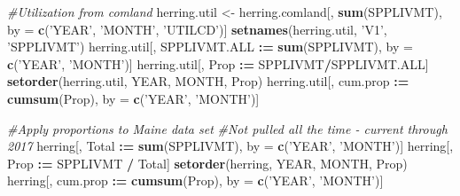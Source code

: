 \documentclass[]{article}
\newenvironment{Shaded}{\begin{snugshade}}{\end{snugshade}}
\newcommand{\KeywordTok}[1]{\textcolor[rgb]{0.13,0.29,0.53}{\textbf{#1}}}
\newcommand{\StringTok}[1]{\textcolor[rgb]{0.31,0.60,0.02}{#1}}
\newcommand{\CommentTok}[1]{\textcolor[rgb]{0.56,0.35,0.01}{\textit{#1}}}
\newcommand{\OperatorTok}[1]{\textcolor[rgb]{0.81,0.36,0.00}{\textbf{#1}}}
\newcommand{\ErrorTok}[1]{\textcolor[rgb]{0.64,0.00,0.00}{\textbf{#1}}}
\newcommand{\NormalTok}[1]{#1}
\begin{document}
\begin{Shaded}
\begin{Highlighting}[]
{{{{{{\CommentTok{#Utilization from comland}
\NormalTok{herring.util <-}\StringTok{ }\NormalTok{herring.comland[, }\KeywordTok{sum}\NormalTok{(SPPLIVMT), by =}\StringTok{ }\KeywordTok{c}\NormalTok{(}\StringTok{'YEAR'}\NormalTok{, }\StringTok{'MONTH'}\NormalTok{, }\StringTok{'UTILCD'}\NormalTok{)]}
\KeywordTok{setnames}\NormalTok{(herring.util, }\StringTok{'V1'}\NormalTok{, }\StringTok{'SPPLIVMT'}\NormalTok{)}
\NormalTok{herring.util[, SPPLIVMT.ALL }\OperatorTok{:}\ErrorTok{=}\StringTok{ }\KeywordTok{sum}\NormalTok{(SPPLIVMT), by =}\StringTok{ }\KeywordTok{c}\NormalTok{(}\StringTok{'YEAR'}\NormalTok{, }\StringTok{'MONTH'}\NormalTok{)]}
\NormalTok{herring.util[, Prop }\OperatorTok{:}\ErrorTok{=}\StringTok{ }\NormalTok{SPPLIVMT}\OperatorTok{/}\NormalTok{SPPLIVMT.ALL]}
\KeywordTok{setorder}\NormalTok{(herring.util, YEAR, MONTH, Prop)}
\NormalTok{herring.util[, cum.prop }\OperatorTok{:}\ErrorTok{=}\StringTok{ }\KeywordTok{cumsum}\NormalTok{(Prop), by =}\StringTok{ }\KeywordTok{c}\NormalTok{(}\StringTok{'YEAR'}\NormalTok{, }\StringTok{'MONTH'}\NormalTok{)]}

\CommentTok{#Apply proportions to Maine data set}
\CommentTok{#Not pulled all the time - current through 2017}
\NormalTok{herring[, Total }\OperatorTok{:}\ErrorTok{=}\StringTok{ }\KeywordTok{sum}\NormalTok{(SPPLIVMT), by =}\StringTok{ }\KeywordTok{c}\NormalTok{(}\StringTok{'YEAR'}\NormalTok{, }\StringTok{'MONTH'}\NormalTok{)]}
\NormalTok{herring[, Prop }\OperatorTok{:}\ErrorTok{=}\StringTok{ }\NormalTok{SPPLIVMT }\OperatorTok{/}\StringTok{ }\NormalTok{Total]}
\KeywordTok{setorder}\NormalTok{(herring, YEAR, MONTH, Prop)}
\NormalTok{herring[, cum.prop }\OperatorTok{:}\ErrorTok{=}\StringTok{ }\KeywordTok{cumsum}\NormalTok{(Prop), by =}\StringTok{ }\KeywordTok{c}\NormalTok{(}\StringTok{'YEAR'}\NormalTok{, }\StringTok{'MONTH'}\NormalTok{)]}

}}}}}}
\end{Highlighting}
\end{Shaded}
\end{document}

